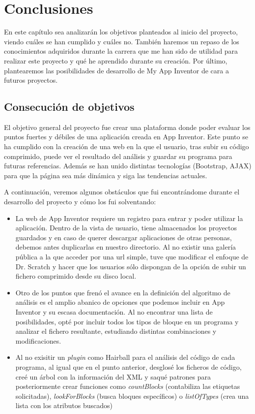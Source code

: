 \documentclass[a4paper, 12pt]{book}
\begin{document}
\cleardoublepage
\chapter{Conclusiones}
\label{chap:conclusiones}
En este capítulo sea analizarán los objetivos planteados al inicio del proyecto, viendo cuáles se han cumplido y cuáles no. También haremos un repaso de los conocimientos adquiridos durante la carrera que me han sido de utilidad para realizar este proyecto  y qué he aprendido durante su creación. Por último, plantearemos las posibilidades de desarrollo de My App Inventor de cara a futuros proyectos. 

\section{Consecución de objetivos}
\label{sec:consecucion-objetivos}
El objetivo general del proyecto fue crear una plataforma donde poder evaluar los puntos fuertes y débiles de una aplicación creada en App Inventor. Este punto se ha cumplido con la creación de una web en la que el usuario, tras subir su código comprimido, puede ver el resultado del análisis y guardar su programa para futuras referencias. Además se han unido distintas tecnologías (Bootstrap, AJAX) para que la página sea más dinámica y siga las tendencias actuales. 

A continuación, veremos algunos obstáculos que fui encontrándome durante el desarrollo del proyecto y cómo los fui solventando:

\begin{itemize}
	\item La web de App Inventor requiere un registro para entrar y poder utilizar la aplicación. Dentro de la vista de usuario, tiene almacenados los proyectos guardados y en caso de querer descargar aplicaciones de otras personas, debemos antes duplicarlas en nuestro directorio. Al no existir una galería pública a la que acceder por una url simple, tuve que modificar el enfoque de Dr. Scratch y hacer que los usuarios sólo dispongan de la opción de subir un fichero comprimido desde su disco local. 
	\item Otro de los puntos que frenó el avance en la definición del algoritmo de análisis es el amplio abanico de opciones que podemos incluir en App Inventor y su escasa documentación. Al no encontrar una lista de posibilidades, opté por incluir todos los tipos de bloque en un programa y analizar el fichero resultante, estudiando distintas combinaciones y modificaciones. 
	\item Al no exisitir un \textit{plugin} como Hairball para el análisis del código de cada programa, al igual que en el punto anterior, desglosé los ficheros de código, creé un árbol con la información del XML y saqué patrones para posteriormente crear funciones como \textit{countBlocks} (contabiliza las etiquetas solicitadas), \textit{lookForBlocks} (busca bloques específicos) o \textit{listOfTypes} (crea una lista con los atributos buscados)
\end{itemize}
\end{document}

